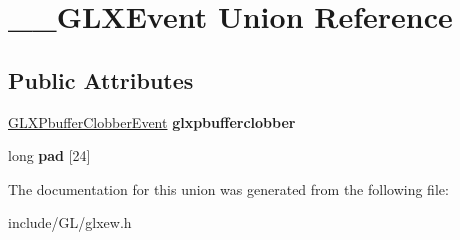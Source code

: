 \hypertarget{union____GLXEvent}{}\section{\+\_\+\+\_\+\+G\+L\+X\+Event Union Reference}
\label{union____GLXEvent}
\subsection*{Public Attributes}
\begin{DoxyCompactItemize}
\item 
\mbox{\label{union____GLXEvent_ada5880e2b424bcb2f60a411aaf713fae}} 
\hyperlink{structGLXPbufferClobberEvent}{G\+L\+X\+Pbuffer\+Clobber\+Event} {\bfseries glxpbufferclobber}
\item 
\mbox{\label{union____GLXEvent_a1cb8f6e7e77a34d25baf43b3f3bc2d4f}} 
long {\bfseries pad} \mbox{[}24\mbox{]}
\end{DoxyCompactItemize}


The documentation for this union was generated from the following file\+:\begin{DoxyCompactItemize}
\item 
include/\+G\+L/glxew.\+h\end{DoxyCompactItemize}

